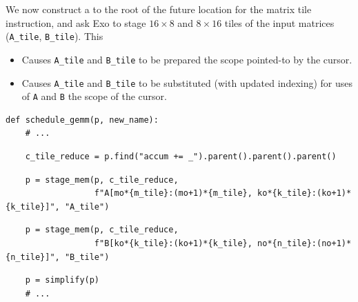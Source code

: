 \hfill
\begin{minipage}[t]{0.6\textwidth}\codeminipage
We now construct a  to the root of the future location for the matrix tile instruction,
  and ask Exo to stage $16 \times 8$ and $8 \times 16$ tiles of the input matrices (\texttt{A\_tile}, \texttt{B\_tile}).
This
\begin{itemize}
  \item Causes \texttt{A\_tile} and \texttt{B\_tile} to be prepared  the scope pointed-to by the cursor.
  \item Causes \texttt{A\_tile} and \texttt{B\_tile} to be substituted (with updated indexing) for uses of \texttt{A} and \texttt{B}  the scope of the cursor.
\end{itemize}
\vspace{6mm}
{\tiny
\begin{verbatim}
def schedule_gemm(p, new_name):
    # ...
\end{verbatim}
\begin{mdframed}[style=MyFrame, backgroundcolor=blueBoxBg]
\color{blueBoxFg}
\begin{verbatim}
    c_tile_reduce = p.find("accum += _").parent().parent().parent()
\end{verbatim}
\end{mdframed}
\begin{mdframed}[style=MyFrame, backgroundcolor=yellowBoxBg]
\color{yellowBoxFg}
\begin{verbatim}
    p = stage_mem(p, c_tile_reduce,
                  f"A[mo*{m_tile}:(mo+1)*{m_tile}, ko*{k_tile}:(ko+1)*{k_tile}]", "A_tile")
\end{verbatim}
\end{mdframed}
\begin{mdframed}[style=MyFrame, backgroundcolor=greenBoxBg]
\color{greenBoxFg}
\begin{verbatim}
    p = stage_mem(p, c_tile_reduce,
                  f"B[ko*{k_tile}:(ko+1)*{k_tile}, no*{n_tile}:(no+1)*{n_tile}]", "B_tile")
\end{verbatim}
\end{mdframed}
\begin{verbatim}
    p = simplify(p)
    # ...
\end{verbatim}
}
\end{minipage}
\newpage
{}


